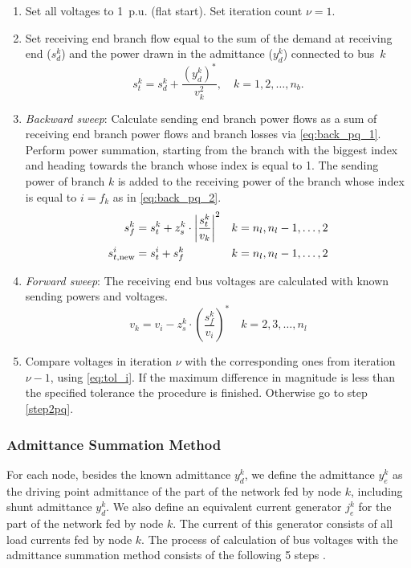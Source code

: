 \documentclass[12pt]{article}
\newcommand{\cc}[1]{{#1}^{\ast}}                        %
\numberwithin{equation}{section}
\numberwithin{table}{section}
\numberwithin{figure}{section}
\begin{document}
\begin{enumerate}
  
  \item Set all voltages to 1~p.u. (flat start). Set iteration count $\nu = 1$.
  
  \item Set receiving end branch flow equal to the sum of the demand at receiving end ($s_d^k$) and the power drawn in the admittance ($y_d^k$) connected to bus~$k$
  \begin{equation}
  \label{eq:s_receiving}
  s_t^k = s_d^k + \frac{\cc{\left(y_d^k\right)}}{v_k^2}, \quad k = 1, 2, \ldots ,n_b.
  \end{equation}
  \label{step2pq}
  
  \item \textit{Backward sweep}: Calculate sending end branch power flows as a sum of receiving end branch power flows and branch losses via \eqref{eq:back_pq_1}. Perform power summation, starting from the branch with the biggest index and heading towards the branch whose index is equal to 1. The sending power of branch $k$ is added to the receiving power of the branch whose index is equal to $i = f_k$ as in \eqref{eq:back_pq_2}.
  \begin{align}
  s_f^k &= s_t^k + z_s^k \cdot \left|\frac{s_t^k}{v_k}\right|^2 & k = n_l, n_l - 1, \ldots ,2
  \label{eq:back_pq_1}
  \\
  s_{t,{\rm new}}^i &= s_t^i + s_f^k & k = n_l, n_l - 1, \ldots ,2
  \label{eq:back_pq_2}
  \end{align}
  
  \item \textit{Forward sweep}: The receiving end bus voltages are calculated with known sending powers and voltages.
  \begin{equation}
  \label{eq:for_pq}
  v_k = v_i - z_s^k \cdot \cc{\left(\frac{s_f^k}{v_i}\right)} \quad k = 2, 3, \ldots ,n_l
  \end{equation}
  
  \item Compare voltages in iteration $\nu$ with the corresponding ones from iteration ${\nu - 1}$, using \eqref{eq:tol_i}. If the maximum difference in magnitude is less than the specified tolerance the procedure is finished. Otherwise go to step \ref{step2pq}.
  
\end{enumerate}

\subsubsection{Admittance Summation Method}
For each node, besides the known admittance $y_d^k$, we define the admittance $y_e^k$ as the driving point admittance of the part of the network fed by node $k$, including shunt admittance $y_d^k$. We also define an equivalent current generator $j_e^k$ for the part of the network fed by node $k$. The current of this generator consists of all load currents fed by node $k$.
The process of calculation of bus voltages with the admittance summation method consists of the following 5 steps \cite{rajicic1998}.
\end{document}
